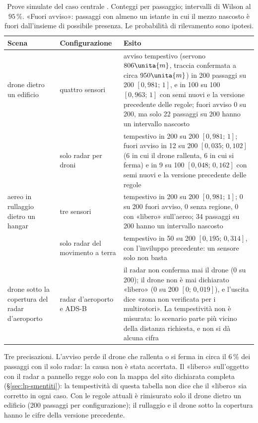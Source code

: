\begin{table}[H]\centering\footnotesize
\caption{Prove simulate del caso centrale . Conteggi per passaggio; intervalli di Wilson al $95\,\%$. «Fuori avviso»: passaggi con almeno un istante in cui il mezzo nascosto è fuori dall'insieme di possibile presenza. Le probabilità di rilevamento sono ipotesi.}\label{tab:lp-prove}
\begin{tabularx}{\linewidth}{@{}>{\RaggedRight\arraybackslash}p{3.0cm}>{\RaggedRight\arraybackslash}p{2.7cm}L@{}}
\toprule
Scena & Configurazione & Esito\\
\midrule
drone dietro un edificio & quattro sensori & avviso tempestivo (servono $806\unita{m}$, traccia confermata a circa $950\unita{m}$) in 200 passaggi su 200 $[0{,}981;\,1]$, e in 100 su 100 $[0{,}963;\,1]$ con semi nuovi e la versione precedente delle regole; fuori avviso 0 su 200, ma solo 22 passaggi su 200 hanno un intervallo nascosto\\
 & solo radar per droni & tempestivo in 200 su 200 $[0{,}981;\,1]$; fuori avviso in 12 su 200 $[0{,}035;\,0{,}102]$ (6 in cui il drone rallenta, 6 in cui si ferma) e in 9 su 100 $[0{,}048;\,0{,}162]$ con semi nuovi e la versione precedente delle regole\\
aereo in rullaggio dietro un hangar & tre sensori & tempestivo in 200 su 200 $[0{,}981;\,1]$; 0 su 200 fuori avviso, 0 senza regione, 0 con «libero» sull'aereo; 34 passaggi su 200 hanno un intervallo nascosto\\
 & solo radar del movimento a terra & tempestivo in 50 su 200 $[0{,}195;\,0{,}314]$, con l'inviluppo precedente: un sensore solo non basta\\
drone sotto la copertura del radar d'aeroporto & radar d'aeroporto e ADS-B & il radar non conferma mai il drone (0 su 200); il drone non è mai dichiarato «libero» (0 su 200 $[0;\,0{,}019]$), e l'uscita dice «zona non verificata per i multirotori». La tempestività non è misurata: lo scenario parte più vicino della distanza richiesta, e non si dà alcuna cifra\\
\bottomrule
\end{tabularx}
\end{table}

Tre precisazioni. L'avviso perde il drone che rallenta o si ferma in circa il $6\,\%$ dei passaggi con il solo radar: la causa non è stata accertata. Il «libero» sull'oggetto con il radar a pannello regge solo con la mappa del sito dichiarata completa (\S\ref{sec:lp-smentiti}): la tempestività di questa tabella non dice che il «libero» sia corretto in ogni caso. Con le regole attuali è rimisurato solo il drone dietro un edificio (200 passaggi per configurazione); il rullaggio e il drone sotto la copertura hanno le cifre della versione precedente.

